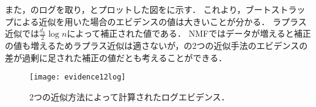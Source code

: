 また，のログを取り，とプロットした図をに示す．
これより，ブートストラップによる近似を用いた場合のエビデンスの値は大きいことが分かる．
ラプラス近似では$\frac{d_k}{2} \log n$によって補正された値である．
NMFではデータが増えると補正の値も増えるためラプラス近似は適さないが，の2つの近似手法のエビデンスの差が過剰に足された補正の値だとも考えることができる．

\begin{figure}[htbp]
    \begin{center}
        \texttt{[image: evidence12log]}
        \caption{2つの近似方法によって計算されたログエビデンス．}
        \label{fig:evidence12}
    \end{center}
\end{figure}
